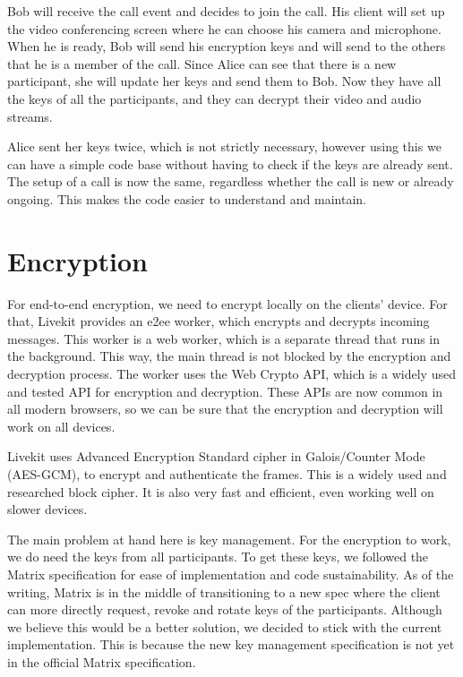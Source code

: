 \documentclass{report}
\begin{document}
Bob will receive the call event and decides to join the call. His client will set up the video conferencing
screen where he can choose his camera and microphone. When he is ready, Bob will send his encryption keys and will
send to the others that he is a member of the call. Since Alice can see that there is a new participant, she will
update her keys and send them to Bob. Now they have all the keys of all the participants, and they can decrypt their
video and audio streams.

Alice sent her keys twice, which is not strictly necessary, however using this we can have a simple code base
without having to check if the keys are already sent. The setup of a call is now the same, regardless whether
the call is new or already ongoing. This makes the code easier to understand and maintain.

\section{Encryption}
For end-to-end encryption, we need to encrypt locally on the clients' device. For that, Livekit provides an e2ee worker,
which encrypts and decrypts incoming messages. This worker is a web worker, which is a separate
thread that runs in the background. This way, the main thread is not blocked by the encryption and decryption
process. The worker uses the Web Crypto API, which is a widely used and tested API for encryption and decryption.
These APIs are now common in all modern browsers, so we can be sure that the encryption and decryption will work on
all devices.

Livekit uses Advanced Encryption Standard cipher in Galois/Counter Mode (AES-GCM)\cite{national_institute_of_standards_and_technology_us_advanced_2023}\cite{
mcgrew_galoiscounter_nodate}, to encrypt and authenticate the frames. This is a widely used and researched block
cipher. It is also very fast and efficient, even working well on slower devices.

The main problem at hand here is key management. For the encryption to work, we do need the keys from all
participants. To get these keys, we followed the Matrix specification for ease of implementation and code
sustainability. As of the writing, Matrix is in the middle of transitioning to a new spec where the client can more
directly request, revoke and rotate keys of the participants. Although we believe this would be a better solution, we
decided to stick with the current implementation. This is because the new key management specification is not yet in
the official Matrix specification.
\end{document}
